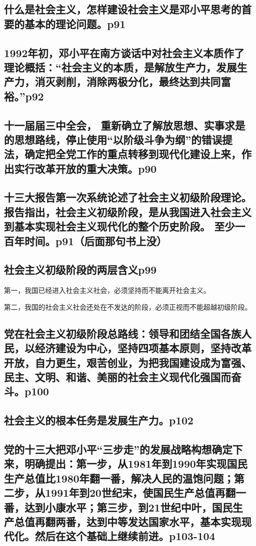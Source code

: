 \documentclass[UTF8]{ctexart}
\begin{document}
\subsection{什么是社会主义，怎样建设社会主义是邓小平思考的首要的基本的理论问题。p91}
\subsection{1992年初，邓小平在南方谈话中对社会主义本质作了理论概括：“社会主义的本质，是解放生产力，发展生产力，消灭剥削，消除两极分化，最终达到共同富裕。”p92 }
\subsection{十一届届三中全会， 重新确立了解放思想、实事求是的思想路线，停止使用“以阶级斗争为纲”的错误提法，确定把全党工作的重点转移到现代化建设上来，作出实行改革开放的重大决策。p90}
\subsection{十三大报告第一次系统论述了社会主义初级阶段理论。报告指出，社会主义初级阶段，是从我国进入社会主义到基本实现社会主义现代化的整个历史阶段。 至少一百年时间。p91（后面那句书上没）}
\subsection{社会主义初级阶段的两层含义p99}
 \par 第一，我国已经进入社会主义社会，必须坚持而不能离开社会主义。
 \par 第二，我国的社会主义社会还处在不发达的阶段，必须正视而不能超越初级阶段。
\subsection{党在社会主义初级阶段总路线：领导和团结全国各族人民，以经济建设为中心，坚持四项基本原则，坚持改革开放，自力更生，艰苦创业，为把我国建设成为富强、民主、文明、和谐、美丽的社会主义现代化强国而奋斗。p100}
\subsection{社会主义的根本任务是发展生产力。p102}
\subsection{党的十三大把邓小平“三步走”的发展战略构想确定下来，明确提出：第一步，从1981年到1990年实现国民生产总值比1980年翻一番，解决人民的温饱问题；第二步，从1991年到20世纪末，使国民生产总值再翻一番，达到小康水平；第三步，到21世纪中叶，国民生产总值再翻两番，达到中等发达国家水平，基本实现现代化。然后在这个基础上继续前进。p103-104}
\end{document}
